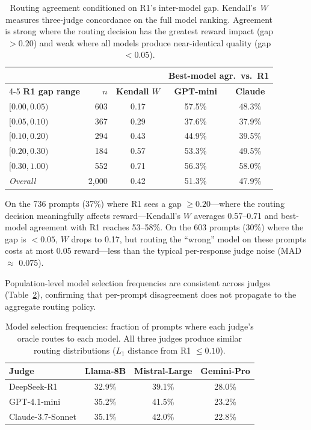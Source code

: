 \begin{table}[h]
\centering
\caption{Routing agreement conditioned on R1's inter-model gap.
Kendall's~$W$ measures three-judge concordance on the full model ranking.
Agreement is strong where the routing decision has the greatest reward
impact (gap $> 0.20$) and weak where all models produce near-identical
quality (gap $< 0.05$).}
\label{tab:routing_diagnostics}
\small
\begin{tabular}{lrccc}
\toprule
& & & \multicolumn{2}{c}{\textbf{Best-model agr.\ vs.\ R1}} \\
\cmidrule(lr){4-5}
\textbf{R1 gap range} & $n$ & \textbf{Kendall $W$}
    & \textbf{GPT-mini} & \textbf{Claude} \\
\midrule
$[0.00, 0.05)$ & 603  & 0.17 & 57.5\% & 48.3\% \\
$[0.05, 0.10)$ & 367  & 0.29 & 37.6\% & 37.9\% \\
$[0.10, 0.20)$ & 294  & 0.43 & 44.9\% & 39.5\% \\
$[0.20, 0.30)$ & 184  & 0.57 & 53.3\% & 49.5\% \\
$[0.30, 1.00)$ & 552  & 0.71 & 56.3\% & 58.0\% \\
\midrule
\emph{Overall} & 2{,}000 & 0.42 & 51.3\% & 47.9\% \\
\bottomrule
\end{tabular}
\end{table}

On the 736 prompts (37\%) where R1 sees a gap $\geq 0.20$---where
the routing decision meaningfully affects reward---Kendall's $W$
averages 0.57--0.71 and best-model agreement with R1 reaches
53--58\%.  On the 603 prompts (30\%) where the gap is $< 0.05$,
$W$ drops to 0.17, but routing the ``wrong'' model on these prompts
costs at most 0.05 reward---less than the typical per-response judge
noise (MAD ${\approx}$ 0.075).

Population-level model selection frequencies are consistent across judges
(Table~\ref{tab:model_selection}), confirming that per-prompt disagreement
does not propagate to the aggregate routing policy.

\begin{table}[h]
\centering
\caption{Model selection frequencies: fraction of prompts where each judge's
oracle routes to each model.  All three judges produce similar routing
distributions ($L_1$ distance from R1 $\leq 0.10$).}
\label{tab:model_selection}
\small
\begin{tabular}{lccc}
\toprule
\textbf{Judge} & \textbf{Llama-8B} & \textbf{Mistral-Large} & \textbf{Gemini-Pro} \\
\midrule
DeepSeek-R1       & 32.9\% & 39.1\% & 28.0\% \\
GPT-4.1-mini      & 35.2\% & 41.5\% & 23.2\% \\
Claude-3.7-Sonnet & 35.1\% & 42.0\% & 22.8\% \\
\bottomrule
\end{tabular}
\end{table}

